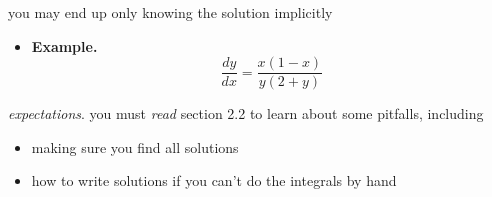 \documentclass{beamer}
\begin{document}
\begin{frame}
you may end up only knowing the solution implicitly
\begin{itemize}
\item \textbf{Example.}
    $$\frac{dy}{dx} = \frac{x(1-x)}{y(2+y)}$$
\end{itemize}
\end{frame}

\begin{frame}
\emph{expectations}.  you must \emph{read} section 2.2 to learn about some pitfalls, including
\begin{itemize}
\item making sure you find all solutions
\item how to write solutions if you can't do the integrals by hand
\end{itemize}
\end{frame}
\end{document}
